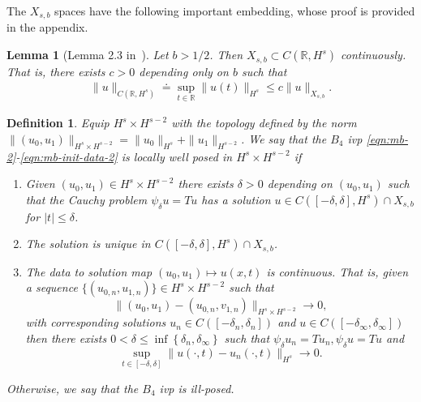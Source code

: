 \documentclass[12pt,reqno]{amsart}
\numberwithin{equation}{section}  %
\newcommand{\rr}{\mathbb{R}}
\newtheorem{lemma}[theorem]{Lemma}
\newtheorem{definition}[theorem]{Definition}
\begin{document}
%
The $X_{s,b}$ spaces have the following important embedding, whose proof is
provided in the appendix.
%
%
%
%
%
%
%
%
\begin{lemma}[Lemma 2.3 in~\cite{Farah:2009uq}]
  Let $b > 1/2$. Then $X_{s, b} \subset C(\rr, H^s)$ continuously. That is,
  there exists $c>0$ depending only on $b$ such that
%
%
\begin{equation*}
\begin{split}
  \| u \|_{C(\rr, H^s)} \doteq \sup_{t \in \rr} \| u(t) \|_{H^s} 
  \le c \| u \|_{X_{s,b}}.
\end{split}
\end{equation*}
%
\label{lem:embedding}
\end{lemma}
%
\begin{definition}
  \label{wp-def}
  Equip $H^{s} \times H^{s-2}$ with the 
  topology defined by the norm $\|(u_{0}, u_{1})\|_{H^{s} \times H^{s-2}}
  = \|u_{0}\|_{H^{s}} + \|u_{1}\|_{H^{s-2}}$.
   We say that the $B_{4}$ ivp
  \eqref{eqn:mb-2}-\eqref{eqn:mb-init-data-2} is
	\emph{locally well posed} in
  $H^s \times H^{s-2}$ if 
	\begin{enumerate}
    \item Given $(u_{0}, u_{1}) \in H^{s} \times H^{s-2}$
      there exists $\delta>0$ depending on $(u_{0}, u_{1})$
      such that the Cauchy problem
      $\psi_{\delta} u = Tu$ has a solution $u \in C([-\delta,
      \delta], H^s) \cap X_{s,b}$ for $ |t| \le \delta$.
    \item The solution is unique in $C([-\delta, \delta], H^{s}) \cap
      X_{s,b}$.
    \item
      The data to solution map $(u_0, u_{1}) \mapsto u(x,t)$ is continuous. That
      is, given a sequence $\{(u_{0,n}, u_{1,n} ) \} \in H^{s} \times H^{s-2}$
      such that $$\|(u_{0}, u_{1})
      - (u_{0,n}, v_{1,n}) \|_{H^{s} \times
      H^{s-2}} \to 0,$$ with corresponding solutions $u_{n} \in
      C([-\delta_{n},
      \delta_{n}])$ and $u \in C([-\delta_{\infty}, \delta_{\infty}])$
      then there exists $0 < \delta \le \inf\left\{
      \delta_{n}, \delta_{\infty} \right\}$ such that $\psi_{\delta}u_{n} =
      Tu_{n}, \psi_{\delta}u = Tu$ and 
      $$\sup_{t \in [-\delta, \delta]}
      \|u(\cdot, t) - u_{n}(\cdot, t) \|_{H^s} \to 0.$$
  \end{enumerate}
	Otherwise, we say that the $B_{4}$ ivp is \emph{ill-posed}.
\end{definition}
%
\end{document}
